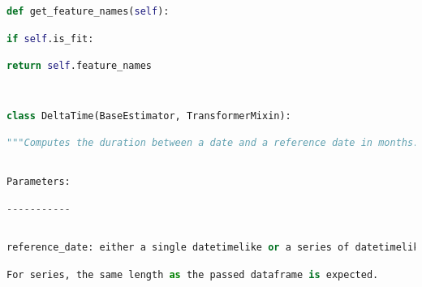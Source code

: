 \documentclass[
  11pt,
  a4paper,
  DIV=12,captions=tableheading,oneside]{scrbook}
\begin{document}
\begin{lstlisting}[language=Python,stepnumber=2,basicstyle=\footnotesize]
    def get_feature_names(self):\end{lstlisting}
\begin{lstlisting}[language=Python,stepnumber=2,basicstyle=\footnotesize]
        if self.is_fit:\end{lstlisting}
\begin{lstlisting}[language=Python,stepnumber=2,basicstyle=\footnotesize]
            return self.feature_names\end{lstlisting}
\begin{lstlisting}[language=Python,stepnumber=2,basicstyle=\footnotesize]
\end{lstlisting}
\begin{lstlisting}[language=Python,stepnumber=2,basicstyle=\footnotesize]
\end{lstlisting}
\begin{lstlisting}[language=Python,stepnumber=2,basicstyle=\footnotesize]
class DeltaTime(BaseEstimator, TransformerMixin):\end{lstlisting}
\begin{lstlisting}[language=Python,stepnumber=2,basicstyle=\footnotesize]
    """Computes the duration between a date and a reference date in months.\end{lstlisting}
\begin{lstlisting}[language=Python,stepnumber=2,basicstyle=\footnotesize]
\end{lstlisting}
\begin{lstlisting}[language=Python,stepnumber=2,basicstyle=\footnotesize]
    Parameters:\end{lstlisting}
\begin{lstlisting}[language=Python,stepnumber=2,basicstyle=\footnotesize]
    -----------\end{lstlisting}
\begin{lstlisting}[language=Python,stepnumber=2,basicstyle=\footnotesize]
\end{lstlisting}
\begin{lstlisting}[language=Python,stepnumber=2,basicstyle=\footnotesize]
    reference_date: either a single datetimelike or a series of datetimelike\end{lstlisting}
\begin{lstlisting}[language=Python,stepnumber=2,basicstyle=\footnotesize]
        For series, the same length as the passed dataframe is expected.\end{lstlisting}
\end{document}
